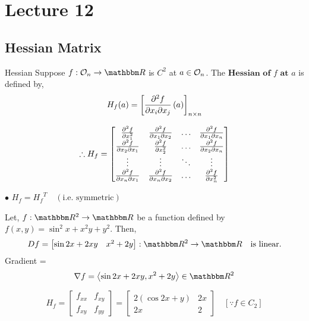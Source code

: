 \documentclass[Analysis-3]{subfiles}
\begin{document}
\chapter*{Lecture 12} %
\setcounter{chapter}{12} %
\setcounter{section}{0}

\section{Hessian Matrix}

\begin{Def}{Hessian}{}
    Suppose $f : \Op{n} \to \R$ is $C^2$ at $a \in \mathcal{O}_{n} $. The $\textbf{Hessian of $f$ at $a$}$ is defined by, \[ H_f(a) = \left[ \pdv{f}{x_i}{x_j}\left( a \right) \right]_{n \times n} \]
\end{Def}

\[ \therefore H_{f} = \begin{bmatrix}
        \pdv[2]{f}{x_1}   & \pdv{f}{x_1}{x_2} & \ldots & \pdv{f}{x_1}{x_n} \\
        \pdv{f}{x_2}{x_1} & \pdv[2]{f}{x_2}   & \ldots & \pdv{f}{x_2}{x_n} \\
        \vdots            & \vdots            & \ddots & \vdots            \\
        \pdv{f}{x_n}{x_1} & \pdv{f}{x_n}{x_2} & \ldots & \pdv[2]{f}{x_n}
    \end{bmatrix} \]

$\bullet$ $H_f = {H_f}^T \quad (\text{i.e. symmetric})$

\begin{Eg}{}{}
    Let, $f : \R^2 \to \R$ be a function defined by $f(x,y) = \sin^2 x + x^2y + y^2$. Then,
    \[Df = \begin{bmatrix}
            \sin2x + 2xy & x^2 + 2y
        \end{bmatrix} :  \R^2 \to \R \quad \text{is linear.} \]
    Gradient = \[\nabla f = \left\langle \sin2x + 2xy, x^2 + 2y \right\rangle \in \R^2 \]

    \[ H_f = \begin{bmatrix}
            f_{xx} & f_{xy} \\
            f_{xy} & f_{yy}
        \end{bmatrix} = \begin{bmatrix}
            2( \cos2x + y) & 2x \\
            2x             & 2
        \end{bmatrix} \quad [ \because  f \in C_2] \]

\end{Eg}
\end{document}
